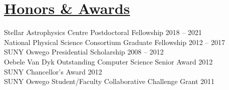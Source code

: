   \section*{\sc\underline{Honors \& Awards}}
  \vspace*{-2mm}
  Stellar Astrophysics Centre Postdoctoral Fellowship \hfill 2018 -- 2021\vspace{1mm}\\
  National Physical Science Consortium Graduate Fellowship    \hfill 2012 -- 2017\vspace{1mm}\\
  SUNY Oswego Presidential Scholarship                        \hfill 2008 -- 2012\vspace{1mm}\\
  Oebele Van Dyk Outstanding Computer Science Senior Award    \hfill 2012\vspace{1mm}\\
  SUNY Chancellor's Award %
  \hfill 2012\vspace{1mm}\\
  SUNY Oswego Student/Faculty Collaborative Challenge Grant   \hfill 2011%
  